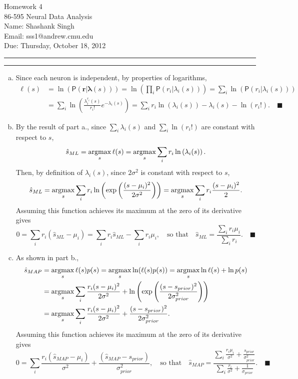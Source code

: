 \documentclass[11pt]{article}
\makeatletter
\newcounter{questionCounter}
\newcounter{partCounter}[questionCounter]
\newenvironment{question}[2][\arabic{questionCounter}]{%
    \setcounter{partCounter}{0}%
    \vspace{.25in} \hrule \vspace{0.5em}%
        \noindent{\bf #2}%
    \vspace{0.8em} \hrule \vspace{.10in}%
    \addtocounter{questionCounter}{1}%
}{}
\newcommand{\myname}{Shashank Singh}
\newcommand{\myandrew}{sss1@andrew.cmu.edu}
\newcommand{\myclass}{86-595 Neural Data Analysis}
\newcommand{\myhwnum}{4}
\newcommand{\duedate}{Thursday, October 18, 2012}
\newcommand{\mqed}{\quad \blacksquare} %
\newcommand{\blambda}{\boldsymbol{\lambda}}
\newcommand{\br}{\mathbf{r}}
\newcommand{\pr}[1]{\mathsf{P}\left( #1 \right)} %
\newcommand{\argmax}{\operatornamewithlimits{argmax}}
\makeatother
\begin{document}
\thispagestyle{plain}

{\Large Homework \myhwnum} \\
\myclass \\
Name: \myname \\
Email: \myandrew \\
Due: \duedate \\
\begin{question}{Problem 1}
\begin{enumerate}[a.]
\item Since each neuron is independent, by properties of logarithms,
\begin{align*}
\ell(s)
 & = \ln \left( \pr{\br | \blambda(s)} \right)
   = \ln \left( \prod_i \pr{r_i | \lambda_i(s)} \right)
   = \sum_i \ln \left( \pr{r_i | \lambda_i(s)} \right) \\
 & = \sum_i \ln \left( \frac{\lambda_i^{r_i}(s)}{r_i!}e^{-\lambda_i(s)} \right)
   = \sum_i r_i \ln \left( \lambda_i(s) \right) - \lambda_i(s) - \ln(r_i!).
     \mqed
\end{align*}

\item By the result of part a., since $\sum_i \lambda_i(s)$ and
$\sum_i \ln(r_i!)$ are constant with respect to $s$,
\[\hat{s}_{ML}
 = \argmax_s \ell(s)
 = \argmax_s \sum_i r_i \ln \left( \lambda_i(s) \right).
\]
Then, by definition of $\lambda_i(s)$, since $2\sigma^2$ is constant with
respect to $s$,
\[\hat{s}_{ML}
 = \argmax_s \sum_i r_i \ln \left( \exp \left( \frac{(s - \mu_i)^2}{2\sigma^2} \right) \right)
 = \argmax_s \sum_i r_i \frac{(s - \mu_i)^2}{2}.
\]
Assuming this function achieves its maximum at the zero of its derivative
gives
\[0
 = \sum_i r_i (\hat{s}_{ML} - \mu_i)
 = \sum_i r_i \hat{s}_{ML} - \sum_i r_i \mu_i,
    \quad \mbox{so that} \quad
\hat{s}_{ML} = \frac{\sum_i r_i \mu_i}{\sum_i r_i}. \mqed\]

\item As shown in part b.,
\begin{align*}
\hat{s}_{MAP}
 & = \argmax_s \ell(s) p(s)
   = \argmax_s \ln (\ell(s) p(s))
   = \argmax_s \ln \ell(s) + \ln p(s) \\
 & = \argmax_s \sum_i \frac{r_i(s - \mu_i)^2}{2\sigma^2} + \ln \left( \exp \left( \frac{(s - s_{prior})^2}{2\sigma_{prior}^2} \right) \right) \\
 & = \argmax_s \sum_i \frac{r_i(s - \mu_i)^2}{2\sigma^2} + \frac{(s - s_{prior})^2}{2\sigma_{prior}^2}.
\end{align*}
Assuming this function achieves its maximum at the zero of its derivative
gives
\[0
 = \sum_i \frac{r_i(\hat{s}_{MAP} - \mu_i)}{\sigma^2} + \frac{(\hat{s}_{MAP} - s_{prior})}{\sigma_{prior}^2},
    \quad \mbox{so that} \quad
\hat{s}_{MAP} = \frac{\sum_i\frac{r_i\mu_i}{\sigma^2} + \frac{s_{prior}}{\sigma_{prior}^2}}{\sum_i \frac{r_i}{\sigma^2} + \frac{1}{\sigma_{prior}}}. \mqed
\]

\end{enumerate}
\end{question}
\end{document}
